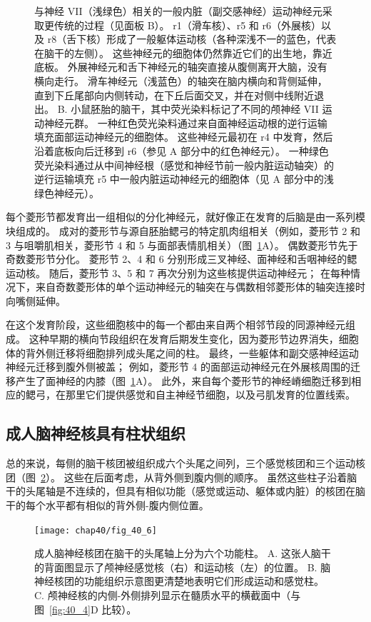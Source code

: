 \begin{figure}[htbp]
{		与神经 VII（浅绿色）相关的一般内脏（副交感神经）运动神经元采取更传统的过程（见面板 B）。
		r1（滑车核）、r5 和 r6（外展核）以及 r8（舌下核）形成了一般躯体运动核（各种深浅不一的蓝色，代表在脑干的左侧）。
		这些神经元的细胞体仍然靠近它们的出生地，靠近底板。
		外展神经元和舌下神经元的轴突直接从腹侧离开大脑，没有横向走行。
		滑车神经元（浅蓝色）的轴突在脑内横向和背侧延伸，直到下丘尾部向内侧转动，在下丘后面交叉，并在对侧中线附近退出。
		B. 小鼠胚胎的脑干，其中荧光染料标记了不同的颅神经 VII 运动神经元群。
		一种红色荧光染料通过来自面神经运动根的逆行运输填充面部运动神经元的细胞体。
		这些神经元最初在 r4 中发育，然后沿着底板向后迁移到 r6（参见 A 部分中的红色神经元）。
		一种绿色荧光染料通过从中间神经根（感觉和神经节前一般内脏运动轴突）的逆行运输填充 r5 中一般内脏运动神经元的细胞体（见 A 部分中的浅绿色神经元）。}
	\label{fig:40_5}
\end{figure}


每个菱形节都发育出一组相似的分化神经元，就好像正在发育的后脑是由一系列模块组成的。
成对的菱形节与源自胚胎鳃弓的特定肌肉组相关（例如，菱形节 2 和 3 与咀嚼肌相关，菱形节 4 和 5 与面部表情肌相关）（图~\ref{fig:40_5}A）。
偶数菱形节先于奇数菱形节分化。
菱形节 2、4 和 6 分别形成三叉神经、面神经和舌咽神经的鳃运动核。
随后，菱形节 3、5 和 7 再次分别为这些核提供运动神经元；
在每种情况下，来自奇数菱形体的单个运动神经元的轴突在与偶数相邻菱形体的轴突连接时向嘴侧延伸。


在这个发育阶段，这些细胞核中的每一个都由来自两个相邻节段的同源神经元组成。
这种早期的横向节段组织在发育后期发生变化，因为菱形节边界消失，细胞体的背外侧迁移将细胞排列成头尾之间的柱。
最终，一些躯体和副交感神经运动神经元迁移到腹外侧被盖；
例如，菱形节 4 的面部运动神经元在外展核周围的迁移产生了面神经的内膝（图~\ref{fig:40_5}A）。
此外，来自每个菱形节的神经嵴细胞迁移到相应的鳃弓，在那里它们提供感觉和自主神经节细胞，以及弓肌发育的位置线索。



\subsection{成人脑神经核具有柱状组织}

总的来说，每侧的脑干核团被组织成六个头尾之间列，三个感觉核团和三个运动核团（图~\ref{fig:40_6}）。
这些在后面考虑，从背外侧到腹内侧的顺序。
虽然这些柱子沿着脑干的头尾轴是不连续的，但具有相似功能（感觉或运动、躯体或内脏）的核团在脑干的每个水平都有相似的背外侧-腹内侧位置。


\begin{figure}[htbp]
	\centering
	\texttt{[image: chap40/fig\_40\_6]}
	\caption{成人脑神经核团在脑干的头尾轴上分为六个功能柱。
		A. 这张人脑干的背面图显示了颅神经感觉核（右）和运动核（左）的位置。
		B. 脑神经核团的功能组织示意图更清楚地表明它们形成运动和感觉柱。
		C. 颅神经核的内侧-外侧排列显示在髓质水平的横截面中（与图~\ref{fig:40_4}D 比较）。}
	\label{fig:40_6}
\end{figure}


